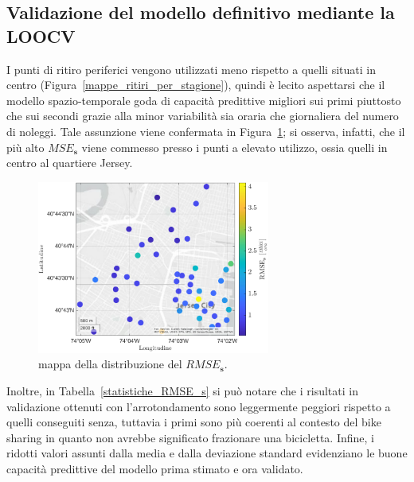 \subsection{Validazione del modello definitivo mediante la LOOCV}
I punti di ritiro periferici vengono utilizzati meno rispetto a quelli situati in centro (Figura~\ref{mappe_ritiri_per_stagione}),  quindi è lecito aspettarsi che il modello spazio-temporale goda di capacità predittive migliori sui primi piuttosto che sui secondi grazie alla minor variabilità sia oraria che giornaliera del numero di noleggi. Tale assunzione viene confermata in Figura~\ref{mappa_RMSE_s}; si osserva, infatti, che il più alto $MSE_\mathbf{s}$ viene commesso presso i punti a elevato utilizzo, ossia quelli in centro al quartiere Jersey.

\begin{figure}[htpb]
	\centering
	\includegraphics[height=215px]{Immagini/4. Caso di studio/LOOCV/RMSE_s}
	\caption[Mappa della distribuzione del $RMSE_\mathbf{s}$]{mappa della distribuzione del $RMSE_\mathbf{s}$.}
	\label{mappa_RMSE_s}
\end{figure}

Inoltre, in Tabella~\ref{statistiche_RMSE_s} si può notare che i risultati in validazione ottenuti con l'arrotondamento sono leggermente peggiori rispetto a quelli conseguiti senza, tuttavia i primi sono più coerenti al contesto del bike sharing in quanto non avrebbe significato frazionare una bicicletta. Infine, i ridotti valori assunti dalla media e dalla deviazione standard evidenziano le buone capacità predittive del modello prima stimato e ora validato.


